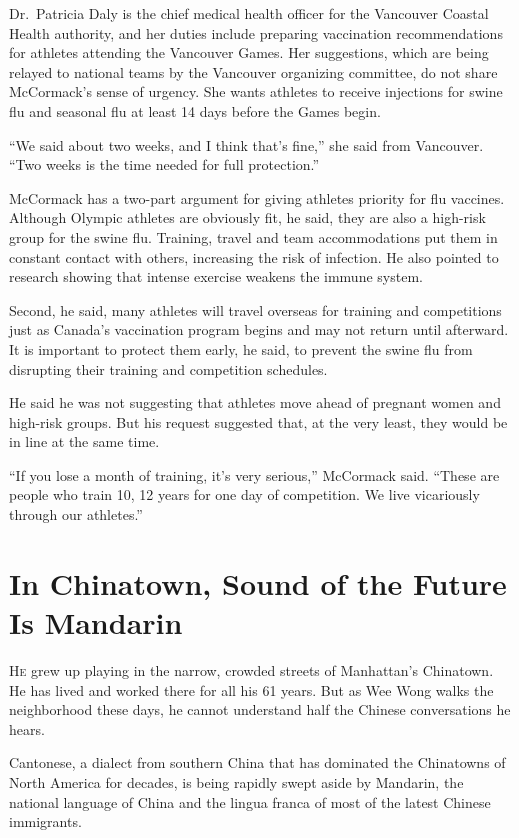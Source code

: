 ﻿\documentclass[12pt]{article}
\begin{document}
Dr.~Patricia Daly is the chief medical health officer for the Vancouver Coastal Health authority,
and her duties include preparing vaccination recommendations for athletes attending the Vancouver
Games. Her suggestions, which are being relayed to national teams by the Vancouver organizing
committee, do not share McCormack's sense of urgency. She wants athletes to receive injections for
swine flu and seasonal flu at least 14 days before the Games begin.

``We said about two weeks, and I think that's fine,'' she said from Vancouver. ``Two weeks is the
time needed for full protection.''

McCormack has a two-part argument for giving athletes priority for flu vaccines. Although Olympic
athletes are obviously fit, he said, they are also a high-risk group for the swine flu. Training,
travel and team accommodations put them in constant contact with others, increasing the risk of
infection. He also pointed to research showing that intense exercise weakens the immune system.

Second, he said, many athletes will travel overseas for training and competitions just as Canada's
vaccination program begins and may not return until afterward. It is important to protect them
early, he said, to prevent the swine flu from disrupting their training and competition schedules.

He said he was not suggesting that athletes move ahead of pregnant women and high-risk groups. But
his request suggested that, at the very least, they would be in line at the same time.

``If you lose a month of training, it's very serious,'' McCormack said. ``These are people who train
10, 12 years for one day of competition. We live vicariously through our athletes.''

\section{In Chinatown, Sound of the Future Is Mandarin}

\lettrine{H}{e} grew up playing in the narrow, crowded streets of
Manhattan's Chinatown. He has lived and worked there for all his 61 years. But as Wee Wong walks the
neighborhood these days, he cannot understand half the Chinese conversations he hears.

Cantonese, a dialect from southern China that has dominated the Chinatowns of North America for
decades, is being rapidly swept aside by Mandarin, the national language of China and the lingua
franca of most of the latest Chinese immigrants.
\end{document}
